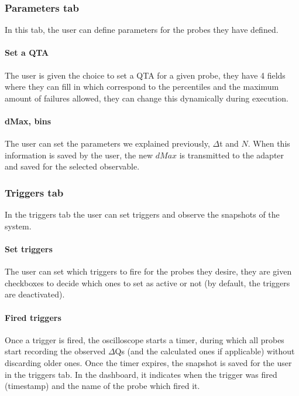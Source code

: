    \subsubsection{Parameters tab}
        In this tab, the user can define parameters for the probes they have defined.

    \paragraph{Set a QTA}
        The user is given the choice to set a QTA for a given probe, they have 4 fields where they can fill in which correspond to the percentiles and the maximum amount of failures allowed, they can change this dynamically during execution.

    \paragraph{dMax, bins}
        The user can set the parameters we explained previously, $\Delta$t and $N$. When this information is saved by the user, the new $dMax$ is transmitted to the adapter and saved for the selected observable.

    \subsubsection{Triggers tab}
        In the triggers tab the user can set triggers and observe the snapshots of the system.

    \paragraph{Set triggers}
        The user can set which triggers to fire for the probes they desire, they are given checkboxes to decide which ones to set as active or not (by default, the triggers are deactivated).
    
    \paragraph{Fired triggers}
        Once a trigger is fired, the oscilloscope starts a timer, during which all probes start recording the observed $\Delta$Qs (and the calculated ones if applicable) without discarding older ones. Once the timer expires, the snapshot is saved for the user in the triggers tab. In the dashboard, it indicates when the trigger was fired (timestamp) and the name of the probe which fired it.
   
